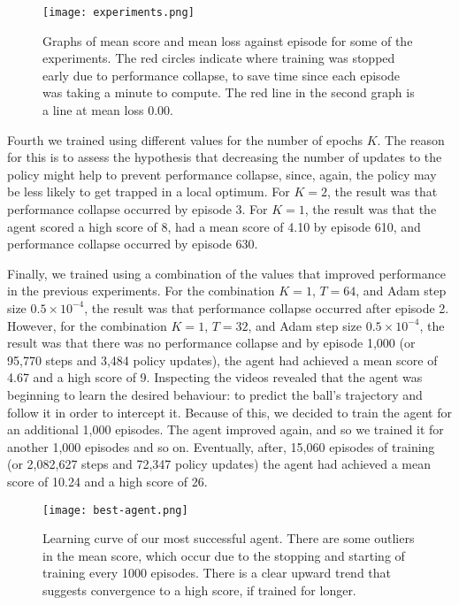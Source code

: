 \documentclass[12pt,a4paper]{article}
\begin{document}
\begin{figure}[ht]
\centering
\texttt{[image: experiments.png]}
\caption{Graphs of mean score and mean loss against episode for some of the experiments. The red circles indicate where training was stopped early due to performance collapse, to save time since each episode was taking a minute to compute. The red line in the second graph is a line at mean loss 0.00.}
\end{figure}

Fourth we trained using different values for the number of epochs $K$. The reason for this is to assess the hypothesis that decreasing the number of updates to the policy might help to prevent performance collapse, since, again, the policy may be less likely to get trapped in a local optimum. For $K=2$, the result was that performance collapse occurred by episode 3. For $K=1$, the result was that the agent scored a high score of 8, had a mean score of 4.10 by episode 610, and performance collapse occurred by episode 630. 

Finally, we trained using a combination of the values that improved performance in the previous experiments. For the combination $K=1$, $T=64$, and Adam step size $0.5 \times 10^{-4}$, the result was that performance collapse occurred after episode 2. However, for the combination $K=1$, $T=32$, and Adam step size $0.5 \times 10^{-4}$, the result was that there was no performance collapse and by episode 1,000 (or 95,770 steps and 3,484 policy updates), the agent had achieved a mean score of 4.67 and a high score of 9. Inspecting the videos revealed that the agent was beginning to learn the desired behaviour: to predict the ball's trajectory and follow it in order to intercept it. Because of this, we decided to train the agent for an additional 1,000 episodes. The agent improved again, and so we trained it for another 1,000 episodes and so on. Eventually, after, 15,060 episodes of training (or 2,082,627 steps and 72,347 policy updates) the agent had achieved a mean score of 10.24 and a high score of 26. 

\begin{figure}[ht]
    \centering
    \texttt{[image: best-agent.png]}
    \caption{Learning curve of our most successful agent. There are some outliers in the mean score, which occur due to the stopping and starting of training every 1000 episodes. There is a clear upward trend that suggests convergence to a high score, if trained for longer.}
\end{figure}
\end{document}
